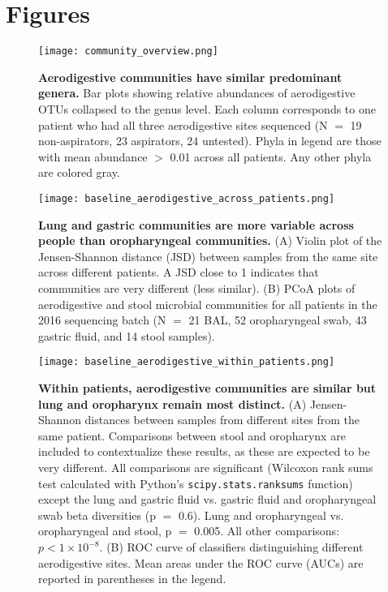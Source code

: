\documentclass{article}
\begin{document}
\section{Figures}

\begin{figure}[h]
        \begin{center}
        \texttt{[image: community\_overview.png]}
        \caption{\textbf{Aerodigestive communities have similar predominant genera.} Bar plots showing relative abundances of aerodigestive OTUs collapsed to the genus level. Each column corresponds to one patient who had all three aerodigestive sites sequenced (N $=$ 19 non-aspirators, 23 aspirators, 24 untested). Phyla in legend are those with mean abundance $>$ 0.01 across all patients. Any other phyla are colored gray.}
        \label{fig:overview_plots}
        \end{center}
\end{figure}

\begin{figure}[h]
        \begin{center}
        \texttt{[image: baseline\_aerodigestive\_across\_patients.png]}
        \caption{\textbf{Lung and gastric communities are more variable across people than oropharyngeal communities.} (A) Violin plot of the Jensen-Shannon distance (JSD) between samples from the same site across different patients. A JSD close to 1 indicates that communities are very different (less similar). (B) PCoA plots of aerodigestive and stool microbial communities for all patients in the 2016 sequencing batch (N $=$ 21 BAL, 52 oropharyngeal swab, 43 gastric fluid, and 14 stool samples).}
        \label{fig:across_people}
        \end{center}
\end{figure}

\begin{figure}[h]
        \begin{center}
        \texttt{[image: baseline\_aerodigestive\_within\_patients.png]}
        \caption{\textbf{Within patients, aerodigestive communities are similar but lung and oropharynx remain most distinct.} (A) Jensen-Shannon distances between samples from different sites from the same patient. Comparisons between stool and oropharynx are included to contextualize these results, as these are expected to be very different. All comparisons are significant (Wilcoxon rank sums test calculated with Python's \texttt{scipy.stats.ranksums} function) except the lung and gastric fluid vs. gastric fluid and oropharyngeal swab beta diversities (p $=$ 0.6). Lung and oropharyngeal vs. oropharyngeal and stool, p $=$ 0.005. All other comparisons:  $p < 1 \times 10^{-8}$. (B) ROC curve of classifiers distinguishing different aerodigestive sites. Mean areas under the ROC curve (AUCs) are reported in parentheses in the legend.}
        \label{fig:within_patients}
        \end{center}
\end{figure}
\end{document}

